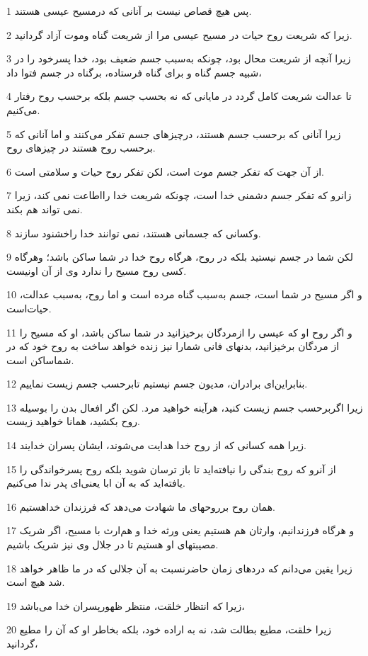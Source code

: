 \par 1 پس هیچ قصاص نیست بر آنانی که درمسیح عیسی هستند.
\par 2 زیرا که شریعت روح حیات در مسیح عیسی مرا از شریعت گناه وموت آزاد گردانید.
\par 3 زیرا آنچه از شریعت محال بود، چونکه به‌سبب جسم ضعیف بود، خدا پسرخود را در شبیه جسم گناه و برای گناه فرستاده، برگناه در جسم فتوا داد،
\par 4 تا عدالت شریعت کامل گردد در مایانی که نه بحسب جسم بلکه برحسب روح رفتار می‌کنیم.
\par 5 زیرا آنانی که برحسب جسم هستند، درچیزهای جسم تفکر می‌کنند و اما آنانی که برحسب روح هستند در چیزهای روح.
\par 6 از آن جهت که تفکر جسم موت است، لکن تفکر روح حیات و سلامتی است.
\par 7 زانرو که تفکر جسم دشمنی خدا است، چونکه شریعت خدا رااطاعت نمی کند، زیرا نمی تواند هم بکند.
\par 8 وکسانی که جسمانی هستند، نمی توانند خدا راخشنود سازند.
\par 9 لکن شما در جسم نیستید بلکه در روح، هرگاه روح خدا در شما ساکن باشد؛ وهرگاه کسی روح مسیح را ندارد وی از آن اونیست.
\par 10 و اگر مسیح در شما است، جسم به‌سبب گناه مرده است و اما روح، به‌سبب عدالت، حیات‌است.
\par 11 و اگر روح او که عیسی را ازمردگان برخیزانید در شما ساکن باشد، او که مسیح را از مردگان برخیزانید، بدنهای فانی شمارا نیز زنده خواهد ساخت به روح خود که در شماساکن است.
\par 12 بنابراین‌ای برادران، مدیون جسم نیستیم تابرحسب جسم زیست نماییم.
\par 13 زیرا اگربرحسب جسم زیست کنید، هرآینه خواهید مرد. لکن اگر افعال بدن را بوسیله روح بکشید، همانا خواهید زیست.
\par 14 زیرا همه کسانی که از روح خدا هدایت می‌شوند، ایشان پسران خدایند.
\par 15 از آنرو که روح بندگی را نیافته‌اید تا باز ترسان شوید بلکه روح پسر‌خواندگی را یافته‌اید که به آن ابا یعنی‌ای پدر ندا می‌کنیم.
\par 16 همان روح برروحهای ما شهادت می‌دهد که فرزندان خداهستیم.
\par 17 و هرگاه فرزندانیم، وارثان هم هستیم یعنی ورثه خدا و هم‌ارث با مسیح، اگر شریک مصیبتهای او هستیم تا در جلال وی نیز شریک باشیم.
\par 18 زیرا یقین می‌دانم که دردهای زمان حاضرنسبت به آن جلالی که در ما ظاهر خواهد شد هیچ است.
\par 19 زیرا که انتظار خلقت، منتظر ظهورپسران خدا می‌باشد،
\par 20 زیرا خلقت، مطیع بطالت شد، نه به اراده خود، بلکه بخاطر او که آن را مطیع گردانید،

